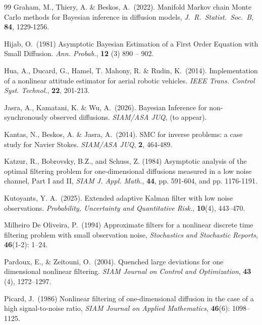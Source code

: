 \documentclass[english,13pt]{article}
\numberwithin{equation}{section}
\begin{document}
\begin{thebibliography}{99}
{\sc Graham,} M., {\sc Thiery,} A. \& {\sc Beskos}, A.~(2022).
Manifold Markov chain Monte Carlo methods for Bayesian inference in diffusion models,  \emph{J.~R.~Statist.~Soc.~B}, {\bf 84},  1229-1256.


{\sc Hijab}, O.~(1981) Asymptotic Bayesian Estimation of a First Order Equation with Small Diffusion. \emph{Ann. Probab.}, {\bf 12} (3) 890 -- 902.  

{\sc Hua},  A.,  {\sc Ducard}, G.,  {\sc Hamel}, T.  {\sc Mahony},  R. \& {\sc Rudin}, K.~(2014).
Implementation of a nonlinear attitude estimator for aerial robotic vehicles.
\emph{IEEE Trans. Control Syst. Technol.},  {\bf 22},  201-213.


{\sc Jasra}, A.,  {\sc Kamatani}, K. \& {\sc Wu},  A.~(2026). Bayesian Inference for non-synchronously observed diffusions.  \emph{SIAM/ASA JUQ},  (to appear).

{\sc Kantas}, N., {\sc Beskos}, A.  \& {\sc Jasra}, A.~(2014). SMC for inverse problems: a case study for Navier Stokes. \emph{SIAM/ASA JUQ},  {\bf 2}, 464-489.



{\sc Katzur}, R., {\sc Bobrovsky}, B.Z., and {\sc Schuss}, Z. (1984) Asymptotic analysis
of the optimal filtering problem for one-dimensional diffusions
measured in a low noise channel, Part I and II, \emph{SIAM J. Appl.
Math.}, {\bf 44}, pp. 591-604, and pp. 1176-1191.

{\sc Kutoyants}, Y. A.~(2025).  Extended adaptive Kalman filter with low noise observations. \emph{Probability, Uncertainty and Quantitative Risk.}, {\bf 10}(4), 443--470. 



{\sc Milheiro De Oliveira}, P.~(1994) Approximate filters for a nonlinear discrete time filtering problem with small observation noise, \emph{Stochastics and Stochastic Reports},  {\bf 46}(1-2): 1--24.


{\sc Pardoux}, E., \& {\sc Zeitouni}, O.~(2004). Quenched large deviations for one dimensional nonlinear filtering. \emph{SIAM Journal  on Control and Optimization}, {\bf 43} (4), 1272--1297.


{\sc Picard}, J.~(1986)  Nonlinear filtering of one-dimensional diffusion in the case of a high signal-to-noise ratio, \emph{SIAM Journal on Applied Mathematics}, {\bf 46}(6): 1098--1125.


\end{thebibliography}
\end{document}
